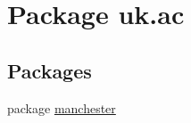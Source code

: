 \hypertarget{namespaceuk_1_1ac}{\section{Package uk.\-ac}
\label{namespaceuk_1_1ac}
}
\subsection*{Packages}
\begin{DoxyCompactItemize}
\item 
package \hyperlink{namespaceuk_1_1ac_1_1manchester}{manchester}
\end{DoxyCompactItemize}

